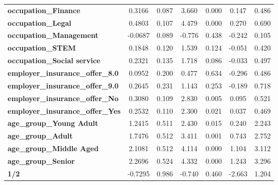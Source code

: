 \begin{center}
\begin{tabular}{lcccccc}
\textbf{occupation\_Finance}             &       0.3166  &        0.087     &     3.660  &         0.000        &        0.147    &        0.486     \\
\textbf{occupation\_Legal}               &       0.4803  &        0.107     &     4.479  &         0.000        &        0.270    &        0.690     \\
\textbf{occupation\_Management}          &      -0.0687  &        0.089     &    -0.776  &         0.438        &       -0.242    &        0.105     \\
\textbf{occupation\_STEM}                &       0.1848  &        0.120     &     1.539  &         0.124        &       -0.051    &        0.420     \\
\textbf{occupation\_Social service}      &       0.2321  &        0.135     &     1.718  &         0.086        &       -0.033    &        0.497     \\
\textbf{employer\_insurance\_offer\_8.0} &       0.0952  &        0.200     &     0.477  &         0.634        &       -0.296    &        0.486     \\
\textbf{employer\_insurance\_offer\_9.0} &       0.2645  &        0.231     &     1.143  &         0.253        &       -0.189    &        0.718     \\
\textbf{employer\_insurance\_offer\_No}  &       0.3080  &        0.109     &     2.830  &         0.005        &        0.095    &        0.521     \\
\textbf{employer\_insurance\_offer\_Yes} &       0.2532  &        0.110     &     2.300  &         0.021        &        0.037    &        0.469     \\
\textbf{age\_group\_Young Adult}         &       1.2415  &        0.511     &     2.430  &         0.015        &        0.240    &        2.243     \\
\textbf{age\_group\_Adult}               &       1.7476  &        0.512     &     3.411  &         0.001        &        0.743    &        2.752     \\
\textbf{age\_group\_Middle Aged}         &       2.1081  &        0.512     &     4.114  &         0.000        &        1.104    &        3.112     \\
\textbf{age\_group\_Senior}              &       2.2696  &        0.524     &     4.332  &         0.000        &        1.243    &        3.296     \\
\textbf{1/2}                             &      -0.7295  &        0.986     &    -0.740  &         0.460        &       -2.663    &        1.204     \\

\end{tabular}
\end{center}
